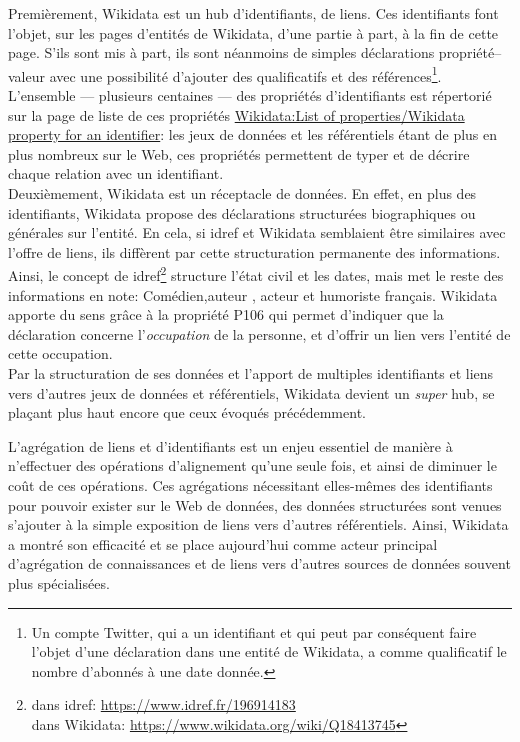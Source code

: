 Premièrement, Wikidata est un hub d'identifiants, de liens. Ces identifiants font l'objet, sur les pages d'entités de Wikidata, d'une partie à part, à la fin de cette page. S'ils sont mis à part, ils sont néanmoins de simples déclarations propriété--valeur avec une possibilité d'ajouter des qualificatifs et des références\footnote{Un compte Twitter, qui a un identifiant et qui peut par conséquent faire l'objet d'une déclaration dans une entité de Wikidata, a comme qualificatif le nombre d'abonnés à une date donnée.}.
L'ensemble --- plusieurs centaines --- des propriétés d'identifiants est répertorié sur la page de liste de ces propriétés \href{https://www.wikidata.org/wiki/Wikidata:List_of_properties/Wikidata_property_for_an_identifier}{Wikidata:List of properties/Wikidata property for an identifier}: les jeux de données et les référentiels étant de plus en plus nombreux sur le Web, ces propriétés permettent de typer et de décrire chaque relation avec un identifiant.\\

Deuxièmement, Wikidata est un réceptacle de données. En effet, en plus des identifiants, Wikidata propose des déclarations structurées biographiques ou générales sur l'entité. En cela, si \ac{idref} et Wikidata semblaient être similaires avec l'offre de liens, ils diffèrent par cette structuration permanente des informations. Ainsi,  le concept  de \ac{idref}\footnote{ dans \ac{idref}: \url{https://www.idref.fr/196914183}\\ dans Wikidata: \url{https://www.wikidata.org/wiki/Q18413745}} structure l'état civil et les dates, mais met le reste des informations en note: \og Comédien,auteur , acteur et humoriste français\fg{}. Wikidata apporte du sens grâce à la propriété P106 qui permet d'indiquer que la déclaration concerne l'\textit{occupation} de la personne, et d'offrir un lien vers l'entité de cette occupation.\\

Par la structuration de ses données et l'apport de multiples identifiants et liens vers d'autres jeux de données et référentiels, Wikidata devient un \textit{super} hub, se plaçant plus haut encore que ceux évoqués précédemment.

\bigskip
\bigskip
L'agrégation de liens et d'identifiants est un enjeu essentiel de manière à n'effectuer des opérations d'alignement qu'une seule fois, et ainsi de diminuer le coût de ces opérations. Ces agrégations nécessitant elles-mêmes des identifiants pour pouvoir exister sur le Web de données, des données structurées sont venues s'ajouter à la simple exposition de liens vers d'autres référentiels. Ainsi, Wikidata a montré son efficacité et se place aujourd'hui comme acteur principal d'agrégation de connaissances et de liens vers d'autres sources de données souvent plus spécialisées.